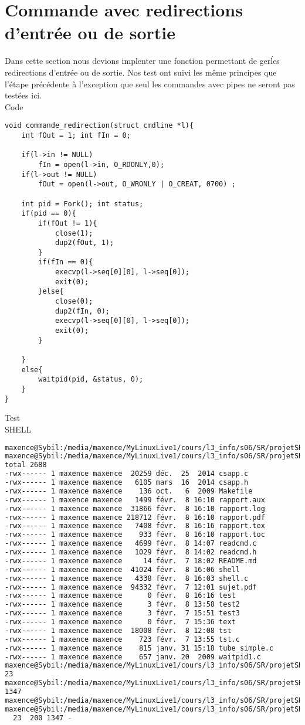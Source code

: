 \documentclass{report}
\begin{document}
		\section{Commande avec redirections d'entr\'ee ou de sortie}
			Dans cette section nous devions implenter une fonction permettant de ger\'les redirections d'entr\'ee ou de sortie. Nos test ont suivi les m\^eme principes que l'\'etape pr\'ec\'edente \`a l'exception que seul les commandes avec pipes ne seront pas test\'ees ici. \\ Code
			\begin{lstlisting}
void commande_redirection(struct cmdline *l){
	int fOut = 1; int fIn = 0;

	if(l->in != NULL)
		fIn = open(l->in, O_RDONLY,0);
	if(l->out != NULL)
		fOut = open(l->out, O_WRONLY | O_CREAT, 0700) ;

	int pid = Fork(); int status;
	if(pid == 0){
		if(fOut != 1){
			close(1);
			dup2(fOut, 1);
		}
		if(fIn == 0){
			execvp(l->seq[0][0], l->seq[0]);
			exit(0);
		}else{
			close(0);
			dup2(fIn, 0);
			execvp(l->seq[0][0], l->seq[0]);
			exit(0);
		}
		
	}
	else{
		waitpid(pid, &status, 0);
	}
}
			\end{lstlisting}
			Test \\ SHELL
			\begin{lstlisting}[frame=single,basicstyle=\footnotesize,language=bash]
maxence@Sybil:/media/maxence/MyLinuxLive1/cours/l3_info/s06/SR/projetSHELL$ ls -l > test
maxence@Sybil:/media/maxence/MyLinuxLive1/cours/l3_info/s06/SR/projetSHELL$ cat test
total 2688
-rwx------ 1 maxence maxence  20259 déc.  25  2014 csapp.c
-rwx------ 1 maxence maxence   6105 mars  16  2014 csapp.h
-rwx------ 1 maxence maxence    136 oct.   6  2009 Makefile
-rwx------ 1 maxence maxence   1499 févr.  8 16:10 rapport.aux
-rwx------ 1 maxence maxence  31866 févr.  8 16:10 rapport.log
-rwx------ 1 maxence maxence 218712 févr.  8 16:10 rapport.pdf
-rwx------ 1 maxence maxence   7408 févr.  8 16:16 rapport.tex
-rwx------ 1 maxence maxence    933 févr.  8 16:10 rapport.toc
-rwx------ 1 maxence maxence   4699 févr.  8 14:07 readcmd.c
-rwx------ 1 maxence maxence   1029 févr.  8 14:02 readcmd.h
-rwx------ 1 maxence maxence     14 févr.  7 18:02 README.md
-rwx------ 1 maxence maxence  41024 févr.  8 16:06 shell
-rwx------ 1 maxence maxence   4338 févr.  8 16:03 shell.c
-rwx------ 1 maxence maxence  94332 févr.  7 12:01 sujet.pdf
-rwx------ 1 maxence maxence      0 févr.  8 16:16 test
-rwx------ 1 maxence maxence      3 févr.  8 13:58 test2
-rwx------ 1 maxence maxence      3 févr.  7 15:51 test3
-rwx------ 1 maxence maxence      0 févr.  7 15:36 text
-rwx------ 1 maxence maxence  18008 févr.  8 12:08 tst
-rwx------ 1 maxence maxence    723 févr.  7 13:55 tst.c
-rwx------ 1 maxence maxence    815 janv. 31 15:18 tube_simple.c
-rwx------ 1 maxence maxence    657 janv. 20  2009 waitpid1.c
maxence@Sybil:/media/maxence/MyLinuxLive1/cours/l3_info/s06/SR/projetSHELL$ wc -l < test
23
maxence@Sybil:/media/maxence/MyLinuxLive1/cours/l3_info/s06/SR/projetSHELL$ wc -c < test
1347
maxence@Sybil:/media/maxence/MyLinuxLive1/cours/l3_info/s06/SR/projetSHELL$ wc - < test > test2
maxence@Sybil:/media/maxence/MyLinuxLive1/cours/l3_info/s06/SR/projetSHELL$ cat test2
  23  200 1347 -
			\end{lstlisting}
\end{document}
